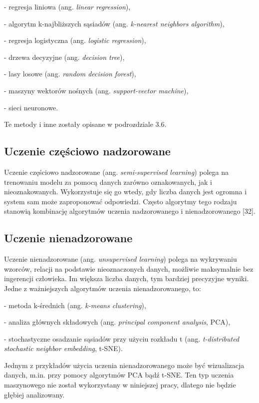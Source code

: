 - regresja liniowa (ang. \textit{linear regression}),

- algorytm k-najbliższych sąsiadów (ang. \textit{k-nearest neighbors algorithm}),

- regresja logistyczna (ang. \textit{logistic regression}),

- drzewa decyzyjne (ang. \textit{decision tree}),

- lasy losowe (ang. \textit{random decision forest}),

- maszyny wektorów nośnych (ang. \textit{support-vector machine}),

- sieci neuronowe.

\noindent Te metody i inne zostały opisane w podrozdziale 3.6. 

\subsection{Uczenie częściowo nadzorowane}
\label{cha:cha3.2.2}

Uczenie częściowo nadzorowane (ang. \textit{semi-supervised learning}) polega na trenowaniu modelu za pomocą danych zarówno oznakowanych, jak i nieoznakowanych. Wykorzystuje się go wtedy, gdy liczba danych jest ogromna i system sam może zaproponować odpowiedzi. Często algorytmy tego rodzaju stanowią kombinację algorytmów uczenia nadzorowanego i nienadzorowanego [32].

\subsection{Uczenie nienadzorowane}
\label{cha:cha3.2.3}

Uczenie nienadzorowane (ang. \textit{unsupervised learning}) polega na wykrywaniu wzorców, relacji na podstawie nieoznaczonych danych, możliwie maksymalnie bez ingerencji człowieka. Im większa liczba danych, tym bardziej precyzyjne wyniki. Jedne z ważniejszych algorytmów uczenia nienadzorowanego, to:

- metoda k-średnich (ang. \textit{k-means clustering}),

- analiza głównych składowych (ang. \textit{principal component analysis}, PCA),

- stochastyczne osadzanie sąsiadów przy użyciu rozkładu t (ang. \textit{t-distributed stochastic neighbor embedding}, t-SNE).

\noindent Jednym z przykładów użycia uczenia nienadzorowanego może być wizualizacja danych, m.in. przy pomocy algorytmów PCA bądź t-SNE. Ten typ uczenia maszynowego nie został wykorzystany w niniejszej pracy, dlatego nie będzie głębiej analizowany.


